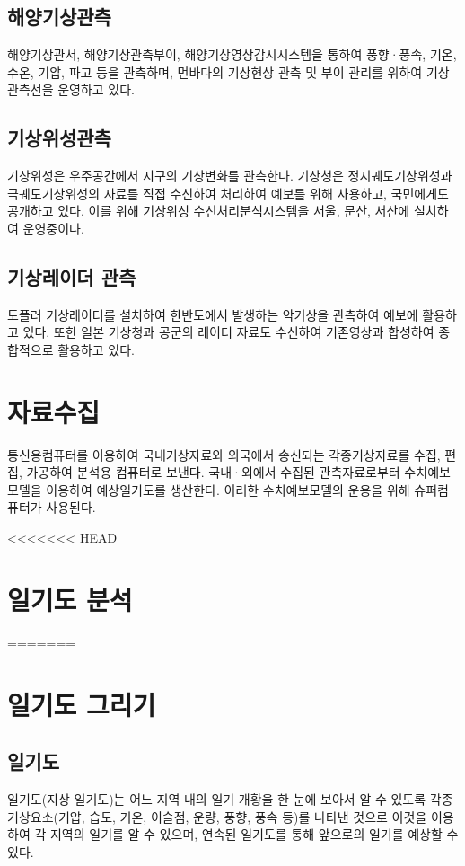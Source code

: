 \subsection{해양기상관측}
해양기상관서, 해양기상관측부이, 해양기상영상감시시스템을 통하여 풍향·풍속, 기온, 수온, 기압, 파고 등을 관측하며, 먼바다의 기상현상 관측 및 부이 관리를 위하여 기상관측선을 운영하고 있다.

\subsection{기상위성관측}
기상위성은 우주공간에서 지구의 기상변화를 관측한다. 기상청은 정지궤도기상위성과 극궤도기상위성의 자료를 직접 수신하여 처리하여 예보를 위해 사용하고, 국민에게도 공개하고 있다. 이를 위해 기상위성 수신처리분석시스템을 서울, 문산, 서산에 설치하여 운영중이다.

\subsection{기상레이더 관측}
도플러 기상레이더를 설치하여 한반도에서 발생하는 악기상을 관측하여 예보에 활용하고 있다. 또한 일본 기상청과 공군의 레이더 자료도 수신하여 기존영상과 합성하여 종합적으로 활용하고 있다.


\section{자료수집}
통신용컴퓨터를 이용하여 국내기상자료와 외국에서 송신되는 각종기상자료를 수집, 편집, 가공하여 분석용 컴퓨터로 보낸다. 국내·외에서 수집된 관측자료로부터 수치예보모델을 이용하여 예상일기도를 생산한다. 이러한 수치예보모델의 운용을 위해 슈퍼컴퓨터가 사용된다.

<<<<<<< HEAD
\section{일기도 분석}
=======


\section{일기도 그리기}

\subsection{일기도}
일기도(지상 일기도)는 어느 지역 내의 일기 개황을 한 눈에 보아서 알 수 있도록
각종 기상요소(기압, 습도, 기온, 이슬점, 운량, 풍향, 풍속 등)를 나타낸 것으로 이것을
이용하여 각 지역의 일기를 알 수 있으며, 연속된 일기도를 통해 앞으로의 일기를 예상할 수 있다.

